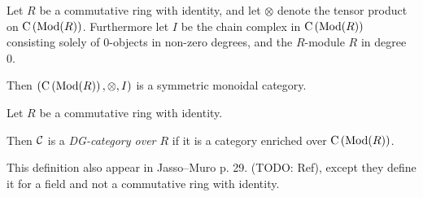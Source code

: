 \begin{fact}[nlab]
    Let \( R \) be a commutative ring with identity, and let \( \otimes \) denote the tensor product on \( \operatorname{C} \left( \operatorname{Mod}(R) \right) \). Furthermore let \( I \) be the chain complex in \( \operatorname{C} \left( \operatorname{Mod}(R) \right) \) consisting solely of \( 0 \)-objects in non-zero degrees, and the \( R \)-module \( R \) in degree 0. 

    Then \( \left( \operatorname{C} \left( \operatorname{Mod}(R) \right), \otimes, I \right) \) is a symmetric monoidal category.
\end{fact}

\begin{definition}%
    Let \( R \) be a commutative ring with identity.

    Then \( {\mathcal{C}} \) is a \emph{DG-category over \( R \)} if it is a category enriched over \( \operatorname{C} \left( \operatorname{Mod}(R) \right) \).
\end{definition}
This definition also appear in Jasso--Muro p. 29. (TODO: Ref), except they define it for a field and not a commutative ring with identity.


    



